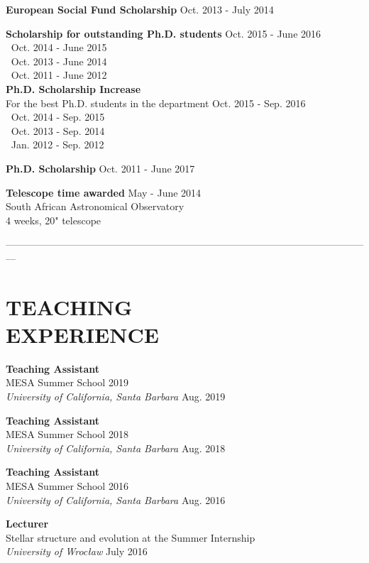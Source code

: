 \documentclass[margin, 10pt]{res} %
\begin{document}
\begin{resume}
{\bf European Social Fund Scholarship} \hfill Oct. 2013 - July 2014

{\bf Scholarship for outstanding Ph.D. students} \hfill Oct. 2015 - June 2016 \\
$~$ \hfill Oct. 2014 - June 2015 \\
$~$ \hfill Oct. 2013 - June 2014 \\
$~$ \hfill Oct. 2011 - June 2012 \\

{\bf Ph.D. Scholarship Increase} \\
For the best Ph.D. students in the department \hfill Oct. 2015 - Sep. 2016 \\
$~$ \hfill Oct. 2014 - Sep. 2015 \\
$~$ \hfill Oct. 2013 - Sep. 2014 \\
$~$ \hfill Jan. 2012 - Sep. 2012

{\bf Ph.D. Scholarship}  \hfill Oct. 2011 - June 2017

{\bf Telescope time awarded}  \hfill May - June 2014 \\
South African Astronomical Observatory \\
4 weeks, 20" telescope

---------------------------------------------------------------------------------------------------------------

\section{TEACHING \\ EXPERIENCE}  

{\bf Teaching Assistant} \\
MESA Summer School 2019 \\
{\sl University of California, Santa Barbara} \hfill Aug. 2019

{\bf Teaching Assistant} \\
MESA Summer School 2018 \\
{\sl University of California, Santa Barbara} \hfill Aug. 2018

{\bf Teaching Assistant} \\
MESA Summer School 2016 \\
{\sl University of California, Santa Barbara} \hfill Aug. 2016

{\bf Lecturer} \\
Stellar structure and evolution at the Summer Internship \\
{\sl University of Wroc\l{}aw} \hfill July 2016


\end{resume}
\end{document}
